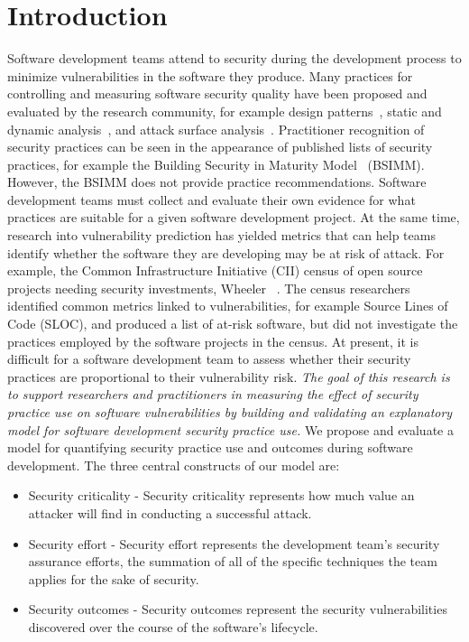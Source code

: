 \section{Introduction}
\label{sec:intro}
Software development teams attend to security during the development process to minimize vulnerabilities in the software they produce. Many practices for controlling and measuring software security quality have been proposed and evaluated by the research community, for example design patterns~\cite{uzunov2015comprehensive}, static and dynamic analysis~\cite{austin2013comparison}, and attack surface analysis~\cite{theisen2015approximating}. Practitioner recognition of security practices can be seen in the appearance of published lists of security practices, for example the Building Security in Maturity Model~\cite{mcgraw2013bsimm} (BSIMM). However, the BSIMM does not provide practice recommendations. Software development teams must collect and evaluate their own evidence for what practices are suitable for a given software development project. 
At the same time, research into vulnerability prediction has yielded metrics that can help teams identify whether the software they are developing may be at risk of attack. For example, the Common Infrastructure Initiative (CII) census of open source projects needing security investments, Wheeler ~\cite{wheeler2015open}. The census researchers identified common metrics linked to vulnerabilities, for example Source Lines of Code (SLOC), and produced a list of at-risk software, but did not investigate the practices employed by the software projects in the census. At present, it is difficult for a software development team to assess whether their security practices are proportional to their vulnerability risk.  
\textit{The goal of this research is to support researchers and practitioners in measuring the effect of security practice use on software vulnerabilities by building and validating an explanatory model for software development security practice use.} We propose and evaluate a model for quantifying security practice use and outcomes during software development. The three central constructs of our model are:
\begin{itemize}
\item Security criticality - Security criticality represents how much value an attacker will find in conducting a successful attack.
\item Security effort - Security effort represents the development team’s security assurance efforts, the summation of all of the specific techniques the team applies for the sake of security. 
\item Security outcomes - Security outcomes represent the security vulnerabilities discovered over the course of the software’s lifecycle.
\end{itemize}
